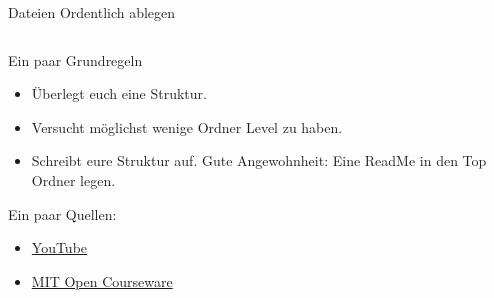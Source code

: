\documentclass[aspectratio=169,shownotes]{beamer}
\begin{document}
\begin{frame}[t]{Dateien Ordentlich ablegen}
    \begin{columns}
        \begin{column}{0.5\textwidth}
            \vspace{-6cm}
            \begin{block}{Ein paar Grundregeln}
                \begin{itemize}
                    \item Überlegt euch eine Struktur.                 
                    \item Versucht möglichst wenige Ordner Level zu haben.
                    \item Schreibt eure Struktur auf. Gute Angewohnheit: Eine ReadMe in den Top Ordner legen.
            \end{itemize}  
            \end{block}
            {\small Ein paar Quellen:
            \begin{itemize}[]
                \item \href{https://www.youtube.com/watch?v=WtKeeDYA_2I&t=317s}{YouTube}
                \item \href{https://ocw.mit.edu/courses/res-str-002-data-management-spring-2016/497580bd31c004cc758a2afb0a115aa4_MITRES_STR_002S16_File.pdf}{MIT Open Courseware}
            \end{itemize}
            }


\end{column}
\end{columns}
\end{frame}
\end{document}

